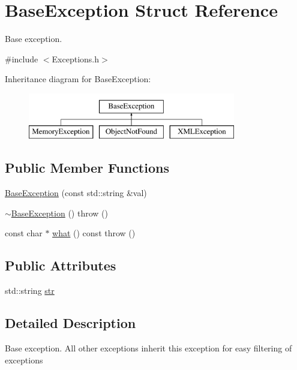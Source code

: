 \hypertarget{structBaseException}{
\section{BaseException Struct Reference}
\label{structBaseException}
}


Base exception.  




{\ttfamily \#include $<$Exceptions.h$>$}

Inheritance diagram for BaseException:\begin{figure}[H]
\begin{center}
\leavevmode
\includegraphics[height=2.000000cm]{structBaseException}
\end{center}
\end{figure}
\subsection*{Public Member Functions}
\begin{DoxyCompactItemize}
\item 
\hyperlink{structBaseException_afceeee9f97b6e2bed459692b4050f1a9}{BaseException} (const std::string \&val)
\item 
\hyperlink{structBaseException_aed58cb09c64408372719754da40022fc}{$\sim$BaseException} ()  throw ()
\item 
const char $\ast$ \hyperlink{structBaseException_a44505abd2e88ffaf5bb90e73452151b6}{what} () const   throw ()
\end{DoxyCompactItemize}
\subsection*{Public Attributes}
\begin{DoxyCompactItemize}
\item 
std::string \hyperlink{structBaseException_a0e59e8c1ac3653ba4c375e446b6a0462}{str}
\end{DoxyCompactItemize}


\subsection{Detailed Description}
Base exception. All other exceptions inherit this exception for easy filtering of exceptions

